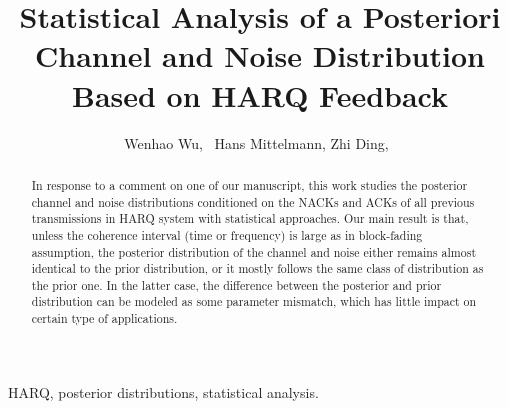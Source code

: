 \documentclass[journal,draftcls,onecolumn,12pt,twoside]{IEEEtran}
\begin{document}
%
\title{Statistical Analysis of a Posteriori Channel and Noise Distribution
Based on HARQ Feedback}
%
%
%

\author{
  Wenhao Wu,~
  Hans Mittelmann,
  Zhi Ding,~
}

\maketitle

\begin{abstract}
  In response to a comment on one of our manuscript, this work studies the
  posterior channel and noise distributions conditioned on the NACKs and ACKs of
  all previous transmissions in HARQ system with statistical approaches. Our main
  result is that, unless the coherence interval (time or frequency) is large as
  in block-fading assumption, the posterior distribution of the channel and
  noise either remains almost identical to the prior distribution, or it mostly
  follows the same class of distribution as the prior one. In the latter case,
  the difference between the posterior and prior distribution can be modeled as
  some parameter mismatch, which has little impact on certain type of
  applications.
\end{abstract}

\begin{IEEEkeywords}
  HARQ, posterior distributions, statistical analysis.
\end{IEEEkeywords}
\end{document}
